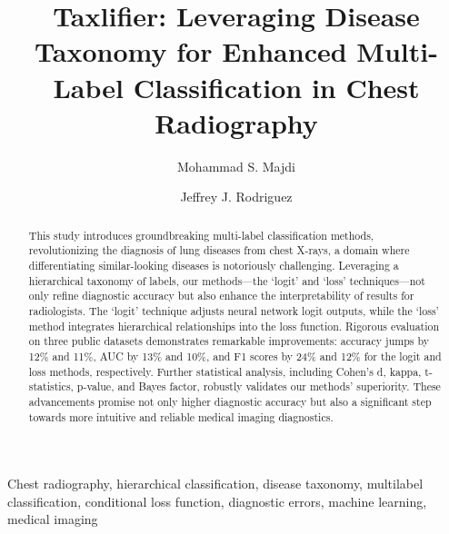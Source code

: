 \documentclass[review,1p,times,numbers]{elsarticle}
\begin{document}
\begin{frontmatter}

    \title{Taxlifier: Leveraging Disease Taxonomy for Enhanced Multi-Label Classification in Chest Radiography}
    \author[]{Mohammad S\@. Majdi}
    \author[]{Jeffrey J\@. Rodriguez}

    \begin{abstract}
        This study introduces groundbreaking multi-label classification methods, revolutionizing the diagnosis of lung diseases from chest X-rays, a domain where differentiating similar-looking diseases is notoriously challenging. Leveraging a hierarchical taxonomy of labels, our methods—the `logit' and `loss' techniques—not only refine diagnostic accuracy but also enhance the interpretability of results for radiologists. The `logit' technique adjusts neural network logit outputs, while the `loss' method integrates hierarchical relationships into the loss function. Rigorous evaluation on three public datasets demonstrates remarkable improvements: accuracy jumps by 12\% and 11\%, AUC by 13\% and 10\%, and F1 scores by 24\% and 12\% for the logit and loss methods, respectively. Further statistical analysis, including Cohen's d, kappa, t-statistics, p-value, and Bayes factor, robustly validates our methods' superiority. These advancements promise not only higher diagnostic accuracy but also a significant step towards more intuitive and reliable medical imaging diagnostics.
    \end{abstract}
    \begin{keyword}
        Chest radiography, hierarchical classification, disease taxonomy, multilabel classification, conditional loss function, diagnostic errors, machine learning, medical imaging
    \end{keyword}


\end{frontmatter}
\end{document}

